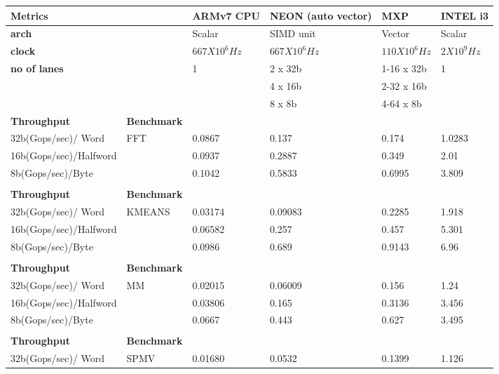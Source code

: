 \begin{table}[htbp]
	\centering
    	\begin{adjustbox}{width=.8\textwidth}
    	\small
	\begin{tabular}{llllll}
		\toprule
		\textbf{Metrics} &   & \textbf{ARMv7 CPU} & \textbf{NEON (auto vector)} & \textbf{MXP} & \textbf{INTEL i3} \\
		\midrule
		\textbf{arch} &   & Scalar & SIMD unit & Vector & Scalar \\
		\textbf{clock} &   & $667 X 10^{6}Hz$ & $667 X 10^{6}Hz$ & $110 X 10^{6}Hz$ & $2 X 10^{9}Hz$ \\
		\textbf{no of lanes} &   & 1 & 2 x 32b & 1-16 x 32b & 1 \\
		&   &   & 4 x 16b & 2-32 x 16b &  \\
		&   &   & 8 x 8b & 4-64 x 8b &  \\
		\midrule
		  \textbf{Throughput} & \textbf{Benchmark} &   &   &   &  \\
		\midrule
		  32b(Gops/sec)/ Word   & FFT & 0.0867 & 0.137 & 0.174 & 1.0283 \\
		  16b(Gops/sec)/Halfword &   & 0.0937 & 0.2887 & 0.349 & 2.01 \\
		  8b(Gops/sec)/Byte &   & 0.1042 & 0.5833 & 0.6995 & 3.809 \\
		    &   &   &   &   &  \\
		\midrule
		  \textbf{Throughput} & \textbf{Benchmark} &   &   &   &  \\
		\midrule
		  32b(Gops/sec)/ Word   & KMEANS & 0.03174 & 0.09083 & 0.2285 & 1.918 \\
		  16b(Gops/sec)/Halfword &   & 0.06582 & 0.257 & 0.457 & 5.301 \\
		  8b(Gops/sec)/Byte &   & 0.0986 & 0.689 & 0.9143 & 6.96 \\
		    &   &   &   &   &  \\
		\midrule
		  \textbf{Throughput} & \textbf{Benchmark} &   &   &   &  \\
		\midrule
		  32b(Gops/sec)/ Word   & MM & 0.02015 & 0.06009 & 0.156 & 1.24 \\
		  16b(Gops/sec)/Halfword &   & 0.03806 & 0.165 & 0.3136 & 3.456 \\
		  8b(Gops/sec)/Byte &   & 0.0667 & 0.443 & 0.627 & 3.495 \\
		    &   &   &   &   &  \\
		\midrule
		  \textbf{Throughput} & \textbf{Benchmark} &   &   &   &  \\
		\midrule
		  32b(Gops/sec)/ Word   & SPMV & 0.01680 & 0.0532 & 0.1399 & 1.126 \\

\end{tabular}
\end{adjustbox}
\end{table}
